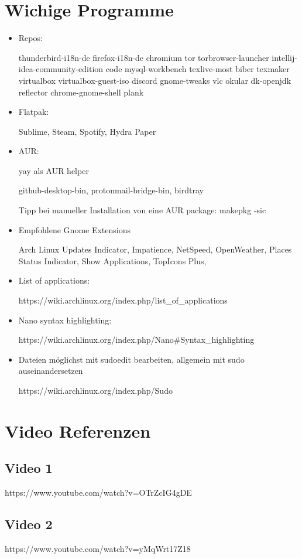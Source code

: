 \documentclass[11pt,a4paper]{article}
\begin{document}
\section{Wichige Programme}
\begin{itemize}
\item Repos:

thunderbird-i18n-de firefox-i18n-de chromium tor torbrowser-launcher intellij-idea-community-edition code mysql-workbench texlive-most biber texmaker virtualbox virtualbox-guest-iso discord gnome-tweaks vlc okular dk-openjdk reflector chrome-gnome-shell plank  
\item Flatpak:

Sublime, Steam, Spotify, Hydra Paper
\item AUR:

\glqq{}yay\grqq{} als AUR helper

github-desktop-bin, protonmail-bridge-bin, birdtray

Tipp bei manueller Installation von eine AUR package: makepkg -sic

\item Empfohlene Gnome Extensions

Arch Linux Updates Indicator, Impatience, NetSpeed, OpenWeather, Places Status Indicator, Show Applications, TopIcons Plus,  

\item List of applications:

https://wiki.archlinux.org/index.php/list\_of\_applications

\item Nano syntax highlighting:

https://wiki.archlinux.org/index.php/Nano\#Syntax\_highlighting

\item Dateien möglichst mit \glqq sudoedit\grqq{} bearbeiten, allgemein mit sudo auseinandersetzen

https://wiki.archlinux.org/index.php/Sudo

\end{itemize}

\section{Video Referenzen}
\subsection{Video 1}
https://www.youtube.com/watch?v=OTrZcIG4gDE
\subsection{Video 2}
https://www.youtube.com/watch?v=yMqWrt17Z18
\end{document}
